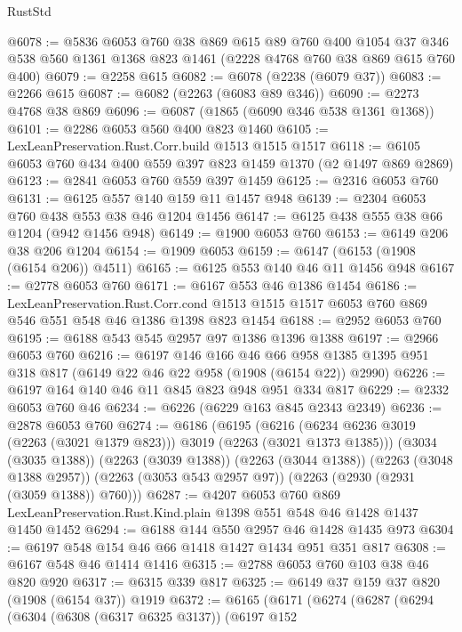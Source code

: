 \begin{lexlean}{RustStd}
\begin{coremodule}
@6078 := @5836
    @6053
    @760
    @38
    @869
    @615
    @89
    @760
    @400
    @1054
    @37
    @346
    @538
    @560
    @1361
    @1368
    @823
    @1461
    (@2228 @4768 @760 @38 @869 @615 @760 @400)
@6079 := @2258 @615
@6082 := @6078 (@2238 (@6079 @37))
@6083 := @2266 @615
@6087 := @6082 (@2263 (@6083 @89 @346))
@6090 := @2273 @4768 @38 @869
@6096 := @6087 (@1865 (@6090 @346 @538 @1361 @1368))
@6101 := @2286 @6053 @560 @400 @823 @1460
@6105 := LexLeanPreservation.Rust.Corr.build @1513 @1515 @1517
@6118 := @6105 @6053 @760 @434 @400 @559 @397 @823 @1459 @1370 (@2 @1497 @869 @2869)
@6123 := @2841 @6053 @760 @559 @397 @1459
@6125 := @2316 @6053 @760
@6131 := @6125 @557 @140 @159 @11 @1457 @948
@6139 := @2304 @6053 @760 @438 @553 @38 @46 @1204 @1456
@6147 := @6125 @438 @555 @38 @66 @1204 (@942 @1456 @948)
@6149 := @1900 @6053 @760
@6153 := @6149 @206 @38 @206 @1204
@6154 := @1909 @6053
@6159 := @6147 (@6153 (@1908 (@6154 @206)) @4511)
@6165 := @6125 @553 @140 @46 @11 @1456 @948
@6167 := @2778 @6053 @760
@6171 := @6167 @553 @46 @1386 @1454
@6186 := LexLeanPreservation.Rust.Corr.cond
    @1513
    @1515
    @1517
    @6053
    @760
    @869
    @546
    @551
    @548
    @46
    @1386
    @1398
    @823
    @1454
@6188 := @2952 @6053 @760
@6195 := @6188 @543 @545 @2957 @97 @1386 @1396 @1388
@6197 := @2966 @6053 @760
@6216 := @6197
    @146
    @166
    @46
    @66
    @958
    @1385
    @1395
    @951
    @318
    @817
    (@6149 @22 @46 @22 @958 (@1908 (@6154 @22)) @2990)
@6226 := @6197 @164 @140 @46 @11 @845 @823 @948 @951 @334 @817
@6229 := @2332 @6053 @760 @46
@6234 := @6226 (@6229 @163 @845 @2343 @2349)
@6236 := @2878 @6053 @760
@6274 := @6186
    (@6195
      (@6216 (@6234 @6236 @3019 (@2263 (@3021 @1379 @823))) @3019 (@2263 (@3021 @1373 @1385)))
      (@3034 (@3035 @1388))
      (@2263 (@3039 @1388))
      (@2263 (@3044 @1388))
      (@2263 (@3048 @1388 @2957))
      (@2263 (@3053 @543 @2957 @97))
      (@2263 (@2930 (@2931 (@3059 @1388)) @760)))
@6287 := @4207
    @6053
    @760
    @869
    LexLeanPreservation.Rust.Kind.plain
    @1398
    @551
    @548
    @46
    @1428
    @1437
    @1450
    @1452
@6294 := @6188 @144 @550 @2957 @46 @1428 @1435 @973
@6304 := @6197 @548 @154 @46 @66 @1418 @1427 @1434 @951 @351 @817
@6308 := @6167 @548 @46 @1414 @1416
@6315 := @2788 @6053 @760 @103 @38 @46 @820 @920
@6317 := @6315 @339 @817
@6325 := @6149 @37 @159 @37 @820 (@1908 (@6154 @37)) @1919
@6372 := @6165
    (@6171
      (@6274
        (@6287
          (@6294
            (@6304
              (@6308 (@6317 @6325 @3137))
              (@6197
                @152

\end{coremodule}
\end{lexlean}
